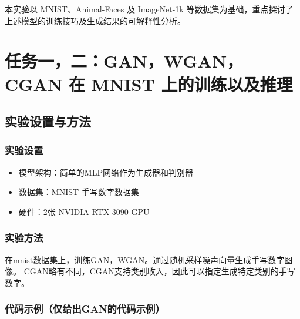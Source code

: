 \documentclass[12pt, a4paper]{article}
\begin{document}
本实验以 MNIST、Animal-Faces 及 ImageNet-1k 等数据集为基础，重点探讨了上述模型的训练技巧及生成结果的可解释性分析。
\newpage
\tableofcontents

\newpage
\section{任务一，二：GAN，WGAN，CGAN 在 MNIST 上的训练以及推理}
\subsection{实验设置与方法}
\subsubsection{实验设置}
\begin{itemize}
    \item 模型架构：简单的MLP网络作为生成器和判别器
    \item 数据集：MNIST 手写数字数据集
    \item 硬件：2张 NVIDIA RTX 3090 GPU 
\end{itemize}

\subsubsection{实验方法}
在mnist数据集上，训练GAN，WGAN。通过随机采样噪声向量生成手写数字图像。
CGAN略有不同，CGAN支持类别收入，因此可以指定生成特定类别的手写数字。

\subsubsection{代码示例（仅给出GAN的代码示例）}
\end{document}
